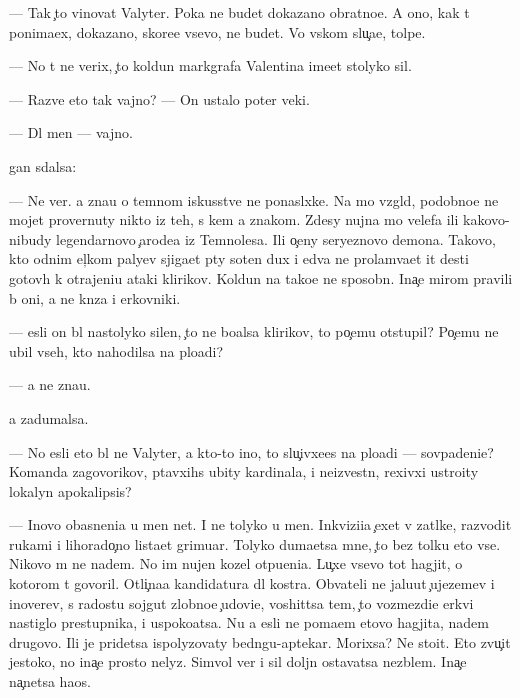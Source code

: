 \documentclass[10pt]{book}
\begin{document}
— Tak {\c}to vinovat Valyter. Poka ne budet dokazano obratno{\y}e. A ono, kak t{\yi} ponima{\y}ex, dokazano, skore{\y}e vsevo, ne budet. Vo vs{\ia}kom slu{\c}a{\y}e, tolpe.

— No t{\yi} ne verix, {\c}to koldun markgrafa Valentina ime{\y}et stolyko sil.

— Razve eto tak vajno? — On ustalo poter veki.

— Dl{\ia} men{\ia} — vajno.

{\Q}{\yi}gan sdalsa:

— Ne ver{\iu}. {\Y}a zna{\y}u o temnom iskusstve ne ponasl{\yi}xke. Na mo{\y} vzgl{\ia}d, podobno{\y}e ne mojet provernuty nikto iz teh, s kem {\y}a znakom. Zdesy nujna mo{\x} velefa ili kakovo-nibudy legendarnovo {\c}arode{\y}a iz Temnoles{\y}a. Ili o{\c}eny seryeznovo demona. Takovo, kto odnim {\x}el{\c}kom paly{\q}ev sjiga{\y}et p{\ia}ty soten dux i {\y}edva ne prolam{\yi}va{\y}et {\x}it des{\ia}ti gotov{\yi}h k otrajeni{\y}u ataki klirikov. Koldun{\yi} na tako{\y}e ne sposobn{\yi}. Ina{\c}e mirom pravili b{\yi} oni, a ne kn{\ia}z{\y}a i {\q}erkovniki.

— {\Y}esli on b{\yi}l nastolyko silen, {\c}to ne bo{\y}alsa klirikov, to po{\c}emu otstupil? Po{\c}emu ne ubil vseh, kto nahodilsa na plo{\x}adi?

— {\Y}a ne zna{\y}u.

{\Y}a zadumalsa.

— No {\y}esli eto b{\yi}l ne Valyter, a kto-to ino{\y}, to slu{\c}ivxe{\y}es{\ia} na plo{\x}adi — sovpadeni{\y}e? Komanda zagovor{\x}ikov, p{\yi}tavxihs{\ia} ubity kardinala, i ne{\y}izvestn{\yi}{\y}, rexivxi{\y} ustro{\y}ity lokalyn{\yi}{\y} apokalipsis?

— Inovo ob{\y}asneni{\y}a u men{\ia} net. I ne tolyko u men{\ia}. Inkvizi{\q}i{\y}a {\c}exet v zat{\yi}lke, razvodit rukami i lihorado{\c}no lista{\y}et grimuar{\yi}. Tolyko duma{\y}etsa mne, {\c}to bez tolku eto vse. Nikovo m{\yi} ne na{\y}dem. No im nujen kozel otpu{\x}eni{\y}a. Lu{\c}xe vsevo tot hagjit, o kotorom t{\yi} govoril. Otli{\c}na{\y}a kandidatura dl{\ia} kostra. Ob{\yi}vateli ne jalu{\y}ut {\c}ujezem{\q}ev i inover{\q}ev, s radost{\y}u sojgut zlobno{\y}e {\c}udovi{\x}e, voshit{\ia}tsa tem, {\c}to vozmezdi{\y}e {\Q}erkvi nastiglo prestupnika, i uspoko{\y}atsa. Nu a {\y}esli ne po{\y}ma{\y}em etovo hagjita, na{\y}dem drugovo. Ili je pridetsa ispolyzovaty bedn{\ia}gu-aptekar{\ia}. Mor{\x}ixsa? Ne sto{\y}it. Eto zvu{\c}it jestoko, no ina{\c}e prosto nelyz{\ia}. Simvol{\yi} ver{\yi} i sil{\yi} doljn{\yi} ostavatsa nez{\yi}blem{\yi}. Ina{\c}e na{\c}netsa haos.
\end{document}
